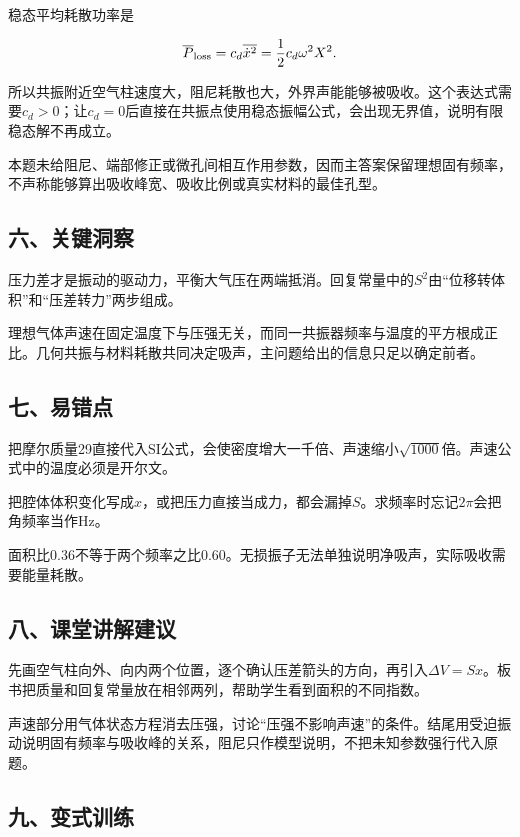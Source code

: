 \documentclass[12pt,a4paper,fontset=fandol]{ctexart}
\begin{document}
稳态平均耗散功率是

\[
\overline P_{\rm loss}
=c_d\overline{\dot x^2}
=\frac12c_d\omega^2X^2.
\]

所以共振附近空气柱速度大，阻尼耗散也大，外界声能能够被吸收。这个表达式需要\(c_d>0\)；让\(c_d=0\)后直接在共振点使用稳态振幅公式，会出现无界值，说明有限稳态解不再成立。

本题未给阻尼、端部修正或微孔间相互作用参数，因而主答案保留理想固有频率，不声称能够算出吸收峰宽、吸收比例或真实材料的最佳孔型。

\subsection{六、关键洞察}\label{ux516dux5173ux952eux6d1eux5bdf-3}

压力差才是振动的驱动力，平衡大气压在两端抵消。回复常量中的\(S^2\)由``位移转体积''和``压差转力''两步组成。

理想气体声速在固定温度下与压强无关，而同一共振器频率与温度的平方根成正比。几何共振与材料耗散共同决定吸声，主问题给出的信息只足以确定前者。

\subsection{七、易错点}\label{ux4e03ux6613ux9519ux70b9-3}

把摩尔质量29直接代入SI公式，会使密度增大一千倍、声速缩小\(\sqrt{1000}\)倍。声速公式中的温度必须是开尔文。

把腔体体积变化写成\(x\)，或把压力直接当成力，都会漏掉\(S\)。求频率时忘记\(2\pi\)会把角频率当作Hz。

面积比0.36不等于两个频率之比0.60。无损振子无法单独说明净吸声，实际吸收需要能量耗散。

\subsection{八、课堂讲解建议}\label{ux516bux8bfeux5802ux8bb2ux89e3ux5efaux8bae-3}

先画空气柱向外、向内两个位置，逐个确认压差箭头的方向，再引入\(\Delta V=Sx\)。板书把质量和回复常量放在相邻两列，帮助学生看到面积的不同指数。

声速部分用气体状态方程消去压强，讨论``压强不影响声速''的条件。结尾用受迫振动说明固有频率与吸收峰的关系，阻尼只作模型说明，不把未知参数强行代入原题。

\subsection{九、变式训练}\label{ux4e5dux53d8ux5f0fux8badux7ec3-3}
\end{document}
